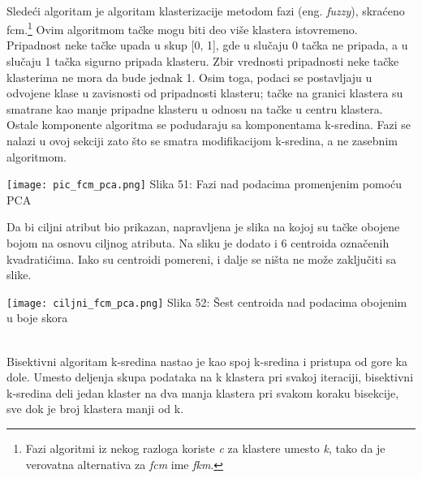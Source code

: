 \documentclass[a4paper]{article}
\begin{document}
{\vphantom{a}\\
\noindent\begin{minipage}{0.4\textwidth}
Sledeći algoritam je algoritam klasterizacije metodom fazi (eng. {\em fuzzy}), skraćeno fcm.\footnote[7]{Fazi algoritmi iz nekog razloga koriste {\em c} za klastere umesto {\em k}, tako da je verovatna alternativa za {\em fcm} ime {\em fkm}.} Ovim algoritmom tačke mogu biti deo više klastera istovremeno. Pripadnost neke tačke upada u skup [0, 1], gde u slučaju 0 tačka ne pripada, a u slučaju 1 tačka sigurno pripada klasteru. Zbir vrednosti pripadnosti neke tačke klasterima ne mora da bude jednak 1. Osim toga, podaci se postavljaju u odvojene klase u zavisnosti od pripadnosti klasteru; tačke na granici klastera su smatrane kao manje pripadne klasteru u odnosu na tačke u centru klastera. Ostale komponente algoritma se podudaraju sa komponentama k-sredina. Fazi se nalazi u ovoj sekciji zato što se smatra modifikacijom k-sredina, a ne zasebnim algoritmom.
\end{minipage}
\noindent\begin{minipage}{0.05\textwidth}
\hphantom{a}
\end{minipage}
\noindent\begin{minipage}{0.48\textwidth}
\texttt{[image: pic\_fcm\_pca.png]}
Slika 51: Fazi nad podacima promenjenim pomoću PCA\\
\end{minipage}

\noindent\begin{minipage}{0.45\textwidth}
Da bi ciljni atribut bio prikazan, napravljena je slika na kojoj su tačke obojene bojom na osnovu ciljnog atributa. Na sliku je dodato i 6 centroida označenih kvadratićima. Iako su centroidi pomereni, i dalje se ništa ne može zaključiti sa slike. \\
\end{minipage}
\noindent\begin{minipage}{0.01\textwidth}
\hphantom{a}
\end{minipage}
\noindent\begin{minipage}{0.6\textwidth}
\texttt{[image: ciljni\_fcm\_pca.png]}
Slika 52: Šest centroida nad podacima obojenim u boje skora\\
\end{minipage}

\vphantom{a}\\
Bisektivni algoritam k-sredina nastao je kao spoj k-sredina i pristupa od gore ka dole. Umesto deljenja skupa podataka na k klastera pri svakoj iteraciji, bisektivni k-sredina deli jedan klaster na dva manja klastera pri svakom koraku bisekcije, sve dok je broj klastera manji od k.\\

}
\end{document}
